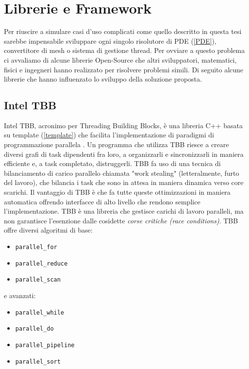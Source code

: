     \section{Librerie e Framework}

    Per riuscire a simulare casi d'uso complicati come quello descritto in questa tesi
    sarebbe impensabile sviluppare ogni singolo risolutore di PDE
    (\ref{PDE}), convertitore di mesh o sistema di gestione
    thread. Per ovviare a questo problema ci avvaliamo di alcune librerie Open-Source che
    altri sviluppatori, matematici, fisici e ingegneri hanno realizzato per risolvere problemi
    simili. Di seguito alcune librerie che hanno influenzato lo sviluppo della soluzione
    proposta.

    \subsection{Intel TBB}\label{tbb}
    Intel TBB, acronimo per Threading Building Blocks, è una libreria C++ basata su template (\ref*{template})
    che facilita l'implementazione di paradigmi di programmazione parallela \cite{KukanovAlexey2007TFfS}.
    Un programma che utilizza TBB riesce a creare diversi grafi di task dipendenti fra loro, a
    organizzarli e sincronizzarli in maniera efficiente e, a task completato, distruggerli. TBB fa uso
    di una tecnica di bilanciamento di carico parallelo chiamata "work stealing" (letteralmente, furto del lavoro),
    che bilancia i task che sono in attesa in maniera dinamica verso core scarichi. Il vantaggio di TBB
    è che fa tutte queste ottimizzazioni in maniera automatica offrendo interfacce di alto livello che rendono
    semplice l'implementazione. TBB è una libreria che gestisce carichi di lavoro paralleli, ma non garantisce
    l'esenzione dalle cosidette \textit{corse critiche (race conditions)}.
    TBB offre diversi algoritmi di base:

    \begin{itemize}
        \item \texttt{parallel\_for}
        \item \texttt{parallel\_reduce}
        \item \texttt{parallel\_scan}
    \end{itemize}

    e avanzati:

    \begin{itemize}
        \item \texttt{parallel\_while}
        \item \texttt{parallel\_do}
        \item \texttt{parallel\_pipeline}
        \item \texttt{parallel\_sort}
    \end{itemize}

